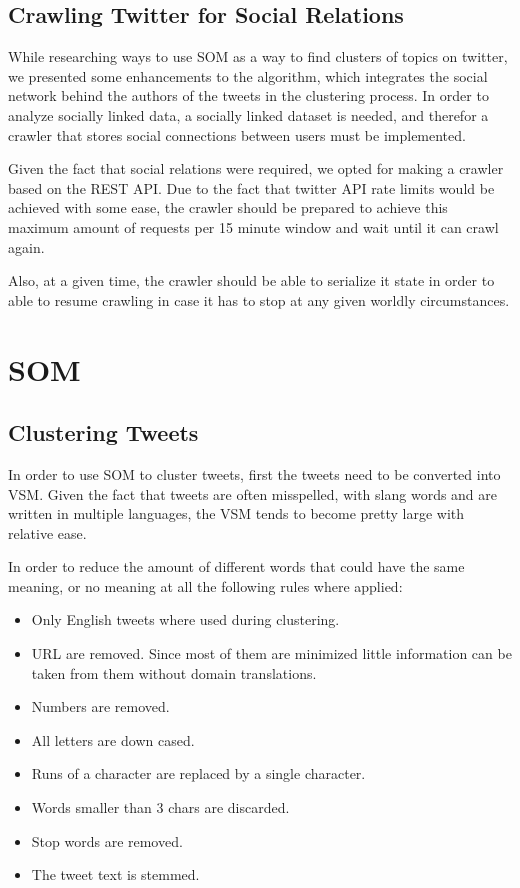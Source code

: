 \subsection{Crawling Twitter for Social Relations}
\label{sub:crawling_twitter_for_social_relations}
While researching ways to use \ac{SOM} as a way to find clusters of topics on twitter, we presented some enhancements to the algorithm, which integrates the social network behind the authors of the tweets in the clustering process. In order to analyze socially linked data, a socially linked dataset is needed, and therefor a crawler that stores social connections between users must be implemented.   

Given the fact that social relations were required, we opted for making a crawler based on the REST API. Due to the fact that twitter API rate limits would be achieved with some ease, the crawler should be prepared to achieve this maximum amount of requests per 15 minute window and wait until it can crawl again. 

Also, at a given time, the crawler should be able to serialize it state in order to able to resume crawling in case it has to stop at any given worldly circumstances. 

\section{SOM}

\subsection{Clustering Tweets}
\label{sub:clustering_tweets}

In order to use \ac{SOM} to cluster tweets, first the tweets need to be converted into \ac{VSM}. Given the fact that tweets are often misspelled, with slang words and are written in multiple languages, the \ac{VSM} tends to become pretty large with relative ease. 

In order to reduce the amount of different words that could have the same meaning, or no meaning at all the following rules where applied:

\begin{itemize}
  \item Only English tweets where used during clustering.
  \item \ac{URL} are removed. Since most of them are minimized little information can be taken from them without domain translations.
  \item Numbers are removed.
  \item All letters are down cased.
  \item Runs of a character are replaced by a single character.
  \item Words smaller than 3 chars are discarded.
  \item Stop words are removed. 
  \item The tweet text is stemmed.
\end{itemize}

